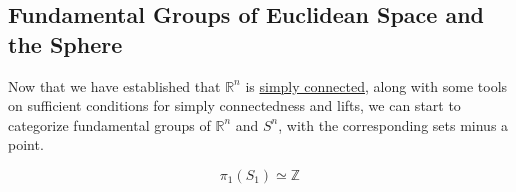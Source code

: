 \subsection{Fundamental Groups of Euclidean Space and the Sphere}

  Now that we have established that $\mathbb{R}^n$ is \hyperref[def:simply-connected]{simply connected}, along with some tools on sufficient conditions for simply connectedness and lifts, we can start to categorize fundamental groups of $\mathbb{R}^n$ and $S^n$, with the corresponding sets minus a point. 

	\begin{theorem}
	  \label{thm:fundamental-group-of-s1}
		\begin{equation}
			\pi_1 (S_1) \simeq \mathbb{Z}
		\end{equation}
	\end{theorem}
